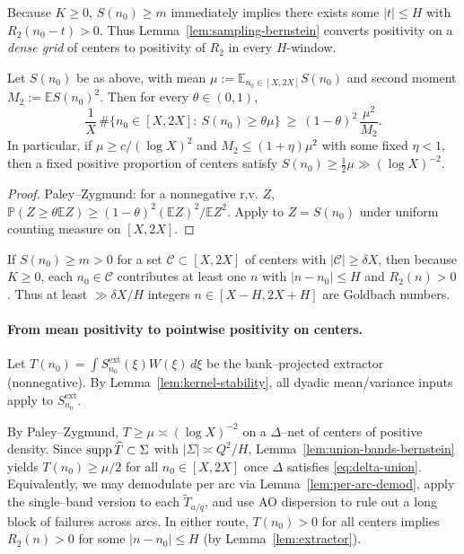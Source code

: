 \begin{remark}
Because $K\ge0$, $S(n_0)\ge m$ immediately implies there exists some $|t|\le H$ with $R_2(n_0-t)>0$. Thus Lemma~\ref{lem:sampling-bernstein} converts positivity on a \emph{dense grid} of centers to positivity of $R_2$ in every $H$-window.
\end{remark}

\begin{lemma}\label{lem:variance-to-many}
Let $S(n_0)$ be as above, with mean $\mu:=\mathbb E_{n_0\in[X,2X]}S(n_0)$ and second moment $M_2:=\mathbb E S(n_0)^2$.
Then for every $\theta\in(0,1)$,
\[
\frac{1}{X}\,\#\Big\{n_0\in[X,2X]:\ S(n_0)\ge \theta\mu\Big\}\ \ge\ (1-\theta)^2\,\frac{\mu^2}{M_2}.
\]
In particular, if $\mu\ge c/(\log X)^2$ and $M_2\le (1+\eta)\mu^2$ with some fixed $\eta<1$, then a fixed positive proportion of centers satisfy $S(n_0)\ge \tfrac12\mu\gg (\log X)^{-2}$.
\end{lemma}

\begin{proof}
Paley–Zygmund: for a nonnegative r.v. $Z$, $\mathbb P(Z\ge \theta \mathbb EZ)\ge (1-\theta)^2(\mathbb EZ)^2/\mathbb EZ^2$. Apply to $Z=S(n_0)$ under uniform counting measure on $[X,2X]$.
\end{proof}

\begin{corollary}\label{cor:positive-window}
If $S(n_0)\ge m>0$ for a set $\mathcal C\subset[X,2X]$ of centers with $|\mathcal C|\ge \delta X$, then because $K\ge0$,
each $n_0\in\mathcal C$ contributes at least one $n$ with $|n-n_0|\le H$ and $R_2(n)>0$.
Thus at least $\gg \delta X/H$ integers $n\in[X-H,2X+H]$ are Goldbach numbers.
\end{corollary}

\paragraph{From mean positivity to pointwise positivity on centers.}
Let $T(n_0)=\int S^{\mathrm{ext}}_{n_0}(\xi)W(\xi)\,d\xi$ be the bank–projected extractor (nonnegative). By Lemma~\ref{lem:kernel-stability}, all dyadic mean/variance inputs apply to $S^{\mathrm{ext}}_{n_0}$.

By Paley--Zygmund, $T\ge \mu\asymp (\log X)^{-2}$ on a $\Delta$–net of centers of positive density.
Since $\operatorname{supp}\widehat T\subset\Sigma$ with $|\Sigma|\asymp Q^2/H$, Lemma~\ref{lem:union-bands-bernstein} yields $T(n_0)\ge \mu/2$ for all $n_0\in[X,2X]$ once $\Delta$ satisfies \eqref{eq:delta-union}. 
Equivalently, we may demodulate per arc via Lemma~\ref{lem:per-arc-demod}, apply the single–band version to each $\widetilde T_{a/q}$, and use AO dispersion to rule out a long block of failures across arcs.
In either route, $T(n_0)>0$ for all centers implies $R_2(n)>0$ for some $|n-n_0|\le H$ (by Lemma~\ref{lem:extractor}).

